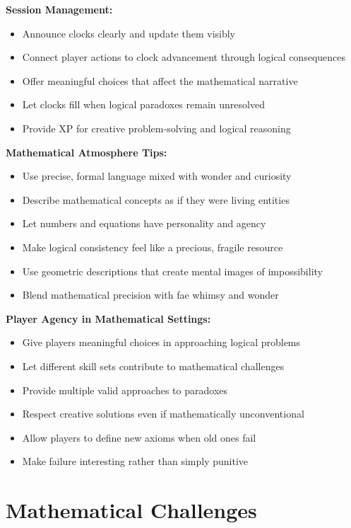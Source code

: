 \documentclass[11pt]{article}
\begin{document}
\textbf{Session Management:}
\begin{itemize}
    \item Announce clocks clearly and update them visibly
    \item Connect player actions to clock advancement through logical consequences
    \item Offer meaningful choices that affect the mathematical narrative
    \item Let clocks fill when logical paradoxes remain unresolved
    \item Provide XP for creative problem-solving and logical reasoning
\end{itemize}

\textbf{Mathematical Atmosphere Tips:}
\begin{itemize}
    \item Use precise, formal language mixed with wonder and curiosity
    \item Describe mathematical concepts as if they were living entities
    \item Let numbers and equations have personality and agency
    \item Make logical consistency feel like a precious, fragile resource
    \item Use geometric descriptions that create mental images of impossibility
    \item Blend mathematical precision with fae whimsy and wonder
\end{itemize}

\textbf{Player Agency in Mathematical Settings:}
\begin{itemize}
    \item Give players meaningful choices in approaching logical problems
    \item Let different skill sets contribute to mathematical challenges
    \item Provide multiple valid approaches to paradoxes
    \item Respect creative solutions even if mathematically unconventional
    \item Allow players to define new axioms when old ones fail
    \item Make failure interesting rather than simply punitive
\end{itemize}

\section{Mathematical Challenges}
\end{document}
